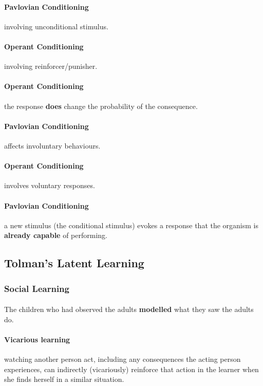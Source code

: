\documentclass{article}
\begin{document}
	\paragraph{Pavlovian Conditioning} involving unconditional stimulus.
	\paragraph{Operant Conditioning} involving reinforcer/punisher.
	\paragraph{Operant Conditioning} the response \textbf{does} change the probability of the consequence.
	\paragraph{Pavlovian Conditioning} affects involuntary behaviours.
	\paragraph{Operant Conditioning} involves voluntary responses.
	\paragraph{Pavlovian Conditioning} a new stimulus (the conditional stimulus) evokes a response that the organism is \textbf{already capable} of performing.
	\subsection{Tolman's Latent Learning}
	\subsubsection{Social Learning}
	\paragraph{} The children who had observed the adults \textbf{modelled} what they saw the adults do.
	\paragraph{Vicarious learning} watching another person act, including any consequences the acting person experiences, can indirectly (vicariously) reinforce that action in the learner when she finds herself in a similar situation.
\end{document}
